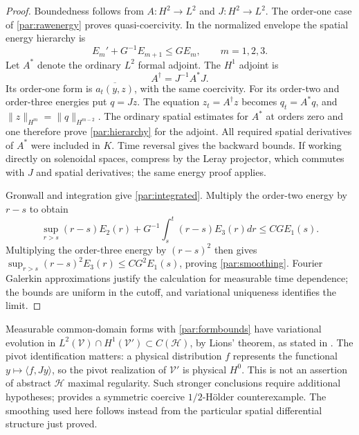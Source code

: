 \documentclass[11pt,a4paper]{amsart}
\theoremstyle{definition}
\theoremstyle{remark}
\numberwithin{equation}{section}
\begin{document}
\begin{proof}
Boundedness follows from $A:H^2\to L^2$ and $J:H^2\to L^2$.
The order-one case of \eqref{par:rawenergy} proves quasi-coercivity.
In the normalized envelope the spatial energy hierarchy is
\begin{equation}\label{par:hierarchy}
 E_m'+G^{-1}E_{m+1}\le GE_m,\qquad m=1,2,3.
\end{equation}
Let $A^*$ denote the ordinary $L^2$ formal adjoint. The $H^1$ adjoint is
\begin{equation}\label{par:adjoint}
 A^\dagger=J^{-1}A^*J.
\end{equation}
Its order-one form is $\overline{a_t(y,z)}$, with the same coercivity.
For its order-two and order-three energies put $q=Jz$. The equation
$z_t=A^\dagger z$ becomes $q_t=A^*q$, and
$\|z\|_{H^m}=\|q\|_{H^{m-2}}$. The ordinary spatial estimates for $A^*$ at
orders zero and one therefore prove \eqref{par:hierarchy} for the adjoint.
All required spatial derivatives of $A^*$ were included in $K$.
Time reversal gives the backward bounds. If working directly on solenoidal
spaces, compress by the Leray projector, which commutes with $J$ and spatial
derivatives; the same energy proof applies.

Gronwall and integration give \eqref{par:integrated}. Multiply the order-two
energy by $r-s$ to obtain
\[
 \sup_{r>s}(r-s)E_2(r)+G^{-1}\int_s^t(r-s)E_3(r)dr
 \le CG E_1(s).
\]
Multiplying the order-three energy by $(r-s)^2$ then gives
$\sup_{r>s}(r-s)^2E_3(r)\le CG^2E_1(s)$, proving
\eqref{par:smoothing}. Fourier Galerkin approximations justify the calculation
for measurable time dependence; the bounds are uniform in the cutoff, and
variational uniqueness identifies the limit.
\end{proof}

Measurable common-domain forms with \eqref{par:formbounds} have variational
evolution in $L^2(\mathscr V)\cap H^1(\mathscr V')\subset C(\mathscr H)$,
by Lions' theorem, as stated in \cite[Theorem~1.1]{ADLO2014}. The pivot
identification matters: a physical distribution $f$ represents the functional
$y\mapsto\langle f,Jy\rangle$, so the pivot realization of $\mathscr V'$ is
physical $H^0$. This is not an assertion of abstract $\mathscr H$ maximal
regularity. Such stronger conclusions require additional hypotheses;
\cite[Theorem~5.1]{Fackler2017} provides a symmetric coercive
$1/2$-H\"older counterexample. The smoothing used here follows instead from
the particular spatial differential structure just proved.
\end{document}
